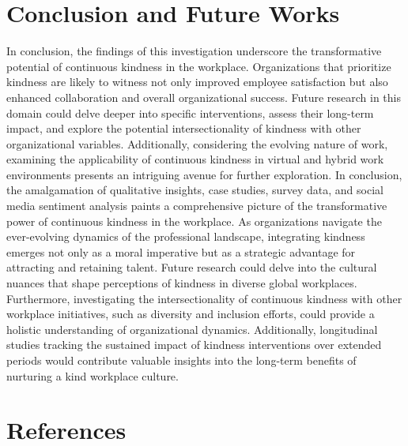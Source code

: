 \documentclass[a4paper, 11pt]{report}
\begin{document}
\section{Conclusion and Future Works}
In conclusion, the findings of this investigation underscore the transformative potential of continuous kindness in the workplace. Organizations that prioritize kindness are likely to witness not only improved employee satisfaction but also enhanced collaboration and overall organizational success. Future research in this domain could delve deeper into specific interventions, assess their long-term impact, and explore the potential intersectionality of kindness with other organizational variables. Additionally, considering the evolving nature of work, examining the applicability of continuous kindness in virtual and hybrid work environments presents an intriguing avenue for further exploration.
\vspace{5mm} %
\newline
In conclusion, the amalgamation of qualitative insights, case studies, survey data, and social media sentiment analysis paints a comprehensive picture of the transformative power of continuous kindness in the workplace. As organizations navigate the ever-evolving dynamics of the professional landscape, integrating kindness emerges not only as a moral imperative but as a strategic advantage for attracting and retaining talent.
\vspace{5mm} %
\newline
Future research could delve into the cultural nuances that shape perceptions of kindness in diverse global workplaces. Furthermore, investigating the intersectionality of continuous kindness with other workplace initiatives, such as diversity and inclusion efforts, could provide a holistic understanding of organizational dynamics. Additionally, longitudinal studies tracking the sustained impact of kindness interventions over extended periods would contribute valuable insights into the long-term benefits of nurturing a kind workplace culture.

\pagebreak
\section{References}
\end{document}
